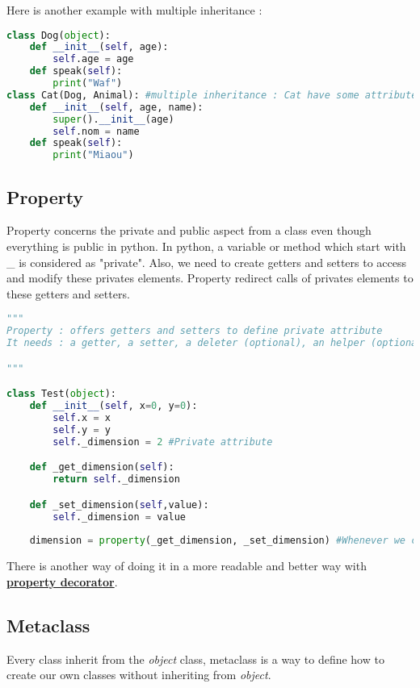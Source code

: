 \documentclass[a4paper, 12pt, titlepage]{scrartcl} %
\begin{document}
Here is another example with multiple inheritance :

\begin{lstlisting}[language=Python]
class Dog(object):
	def __init__(self, age):
		self.age = age
	def speak(self):
		print("Waf")
class Cat(Dog, Animal): #multiple inheritance : Cat have some attributes from Dog but is also an Animal
	def __init__(self, age, name):
		super().__init__(age)
		self.nom = name
	def speak(self):
		print("Miaou")
\end{lstlisting} \vspace{5mm}

\subsection{Property}
Property concerns the private and public aspect from a class even though everything is public in python. In python, a variable or method which start with \_ is considered as "private". Also, we need to create getters and setters to access and modify these privates elements. Property redirect calls of privates elements to these getters and setters.

\begin{lstlisting}[language=Python]
"""
Property : offers getters and setters to define private attribute
It needs : a getter, a setter, a deleter (optional), an helper (optional)

"""

class Test(object):
	def __init__(self, x=0, y=0):
		self.x = x
		self.y = y
		self._dimension = 2 #Private attribute

	def _get_dimension(self):
		return self._dimension

	def _set_dimension(self,value):
		self._dimension = value
		
	dimension = property(_get_dimension, _set_dimension) #Whenever we call object.dimension, property will redirect to private getters/setters.
\end{lstlisting} \vspace{5mm}

There is another way of doing it in a more readable and better way with \hyperref[subsec:Property]{\textbf{property decorator}}.

\subsection{Metaclass}
Every class inherit from the \textit{object} class, metaclass is a way to define how to create our own classes without inheriting from \textit{object}. 
\end{document}
